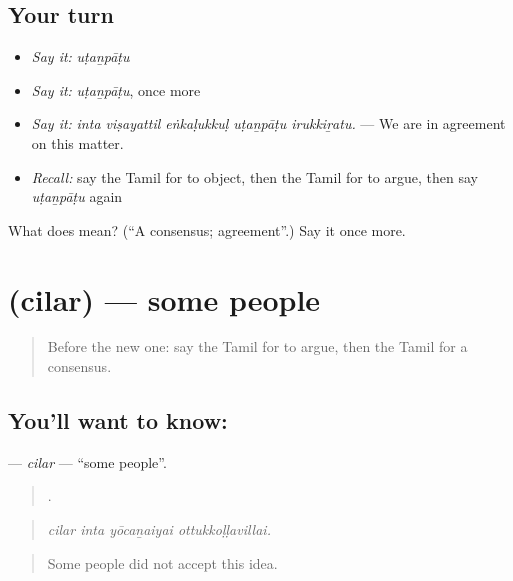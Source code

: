 \subsection*{Your turn}
\begin{itemize}
\raggedright
  \item \emph{Say it:} \emph{uṭaṉpāṭu}
  \item \emph{Say it:} \emph{uṭaṉpāṭu}, once more
  \item \emph{Say it:} \emph{inta viṣayattil eṅkaḷukkuḷ uṭaṉpāṭu irukkiṟatu.} — We are in agreement on this matter.
  \item \emph{Recall:} say the Tamil for to object, then the Tamil for to argue, then say \emph{uṭaṉpāṭu} again
\end{itemize}

\begin{tcolorbox}[breakable,colback=teal!4,colframe=teal!35!black,title={Before you move on}]
What does  mean? (\textquotedblleft{}A consensus; agreement\textquotedblright{}.) Say it once more.
\end{tcolorbox}
\section[\texorpdfstring{\ta{சிலர்} (cilar)}{சிலர் (cilar)}]{ (cilar) — some people}

\label{lesson:TA-C348-cilar}



\begin{quote}
Before the new one: say the Tamil for to argue, then the Tamil for a consensus.
\end{quote}

\subsection*{You'll want to know: }
\textbf{} — \emph{cilar} — \textquotedblleft{}some people\textquotedblright{}.

\begin{quote}
   .
\end{quote}

\begin{quote}
\emph{cilar inta yōcaṉaiyai ottukkoḷḷavillai.}
\end{quote}

\begin{quote}
Some people did not accept this idea.
\end{quote}

